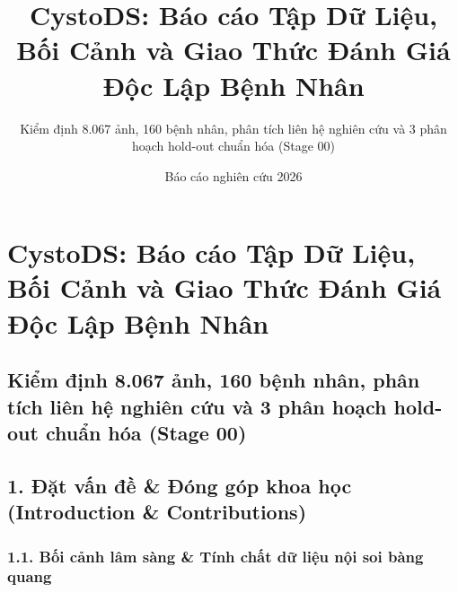\documentclass[
  11pt,
  a4paper,
]{article}
\title{CystoDS: Báo cáo Tập Dữ Liệu, Bối Cảnh và Giao Thức Đánh Giá Độc
Lập Bệnh Nhân}
\subtitle{Kiểm định 8.067 ảnh, 160 bệnh nhân, phân tích liên hệ nghiên
cứu và 3 phân hoạch hold-out chuẩn hóa (Stage 00)}
\author{}
\date{Báo cáo nghiên cứu 2026}
\begin{document}
\maketitle

\section{CystoDS: Báo cáo Tập Dữ Liệu, Bối Cảnh và Giao Thức Đánh Giá
Độc Lập Bệnh
Nhân}\label{cystods-buxe1o-cuxe1o-tux1eadp-dux1eef-liux1ec7u-bux1ed1i-cux1ea3nh-vuxe0-giao-thux1ee9c-ux111uxe1nh-giuxe1-ux111ux1ed9c-lux1eadp-bux1ec7nh-nhuxe2n}

\subsection{Kiểm định 8.067 ảnh, 160 bệnh nhân, phân tích liên hệ nghiên
cứu và 3 phân hoạch hold-out chuẩn hóa (Stage
00)}\label{kiux1ec3m-ux111ux1ecbnh-8.067-ux1ea3nh-160-bux1ec7nh-nhuxe2n-phuxe2n-tuxedch-liuxean-hux1ec7-nghiuxean-cux1ee9u-vuxe0-3-phuxe2n-houx1ea1ch-hold-out-chuux1ea9n-huxf3a-stage-00}

\subsection{1. Đặt vấn đề \& Đóng góp khoa học (Introduction \&
Contributions)}\label{ux111ux1eb7t-vux1ea5n-ux111ux1ec1-ux111uxf3ng-guxf3p-khoa-hux1ecdc-introduction-contributions}

\subsubsection{1.1. Bối cảnh lâm sàng \& Tính chất dữ liệu nội soi bàng
quang}\label{bux1ed1i-cux1ea3nh-luxe2m-suxe0ng-tuxednh-chux1ea5t-dux1eef-liux1ec7u-nux1ed9i-soi-buxe0ng-quang}
\end{document}
